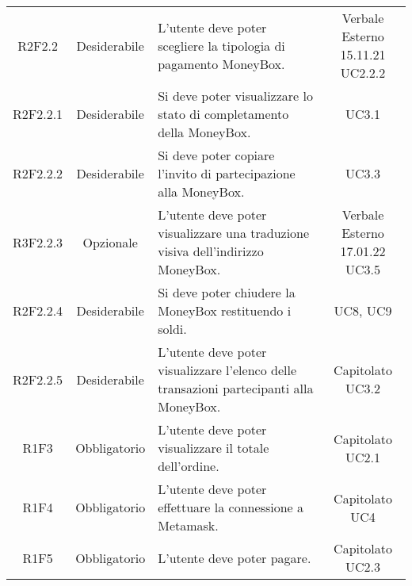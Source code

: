 \begin{table}[H]
\begin{tabular}{c | c | p{6cm} | c }
        R2F2.2                                                            & Desiderabile & L'utente deve poter scegliere la tipologia di pagamento MoneyBox\glo{}.                       & \Shortunderstack{Verbale Esterno 15.11.21\\UC2.2.2\\}      \\
        R2F2.2.1                                                          & Desiderabile & Si deve poter visualizzare lo stato di completamento della MoneyBox\glo{}.                    & UC3.1                                 \\
        R2F2.2.2                                                          & Desiderabile & Si deve poter copiare l'invito di partecipazione alla MoneyBox\glo{}.                         & UC3.3                                 \\
        R3F2.2.3                                                          & Opzionale    & L'utente deve poter visualizzare una traduzione visiva dell'indirizzo MoneyBox\glo{}.         & \Shortunderstack{Verbale Esterno 17.01.22\\UC3.5\\}        \\
        R2F2.2.4                                                          & Desiderabile & Si deve poter chiudere la MoneyBox\glo{} restituendo i soldi.                                 & UC8, UC9                                  \\
        R2F2.2.5                                                          & Desiderabile & L'utente deve poter visualizzare l'elenco delle transazioni partecipanti alla MoneyBox\glo{}. & \Shortunderstack{Capitolato\\UC3.2\\} \\
        R1F3                                                              & Obbligatorio & L'utente deve poter visualizzare il totale dell'ordine.                                       & \Shortunderstack{Capitolato\\UC2.1\\} \\
        R1F4                                                              & Obbligatorio & L'utente deve poter effettuare la connessione a Metamask\glo{}.                               & \Shortunderstack{Capitolato\\UC4\\}   \\
        R1F5                                                              & Obbligatorio & L'utente deve poter pagare.                                                                   & \Shortunderstack{Capitolato\\UC2.3\\} \\
    \end{tabular}
\end{table}
